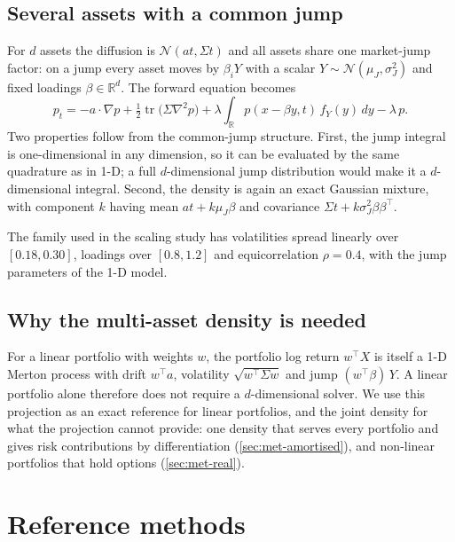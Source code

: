 \subsection{Several assets with a common jump}
For $d$ assets the diffusion is $\mathcal{N}(a t, \Sigma t)$ and all assets share one market-jump factor:
on a jump every asset moves by $\beta_i Y$ with a scalar $Y \sim \mathcal{N}(\mu_J, \sigma_J^2)$ and fixed
loadings $\beta \in \mathbb{R}^d$. The forward equation becomes
\begin{equation}
  p_t = -a \cdot \nabla p + \tfrac12 \operatorname{tr}\!\big(\Sigma \nabla^2 p\big)
        + \lambda \int_{\mathbb{R}} p(x - \beta y, t)\, f_Y(y)\,dy - \lambda\, p .
  \label{eq:pidend}
\end{equation}
Two properties follow from the common-jump structure. First, the jump integral is one-dimensional in any
dimension, so it can be evaluated by the same quadrature as in 1-D; a full $d$-dimensional jump distribution
would make it a $d$-dimensional integral. Second, the density is again an exact Gaussian mixture, with
component $k$ having mean $a t + k\mu_J\beta$ and covariance $\Sigma t + k\sigma_J^2\beta\beta^\top$.

The family used in the scaling study has volatilities spread linearly over $[0.18, 0.30]$, loadings over
$[0.8, 1.2]$ and equicorrelation $\rho = 0.4$, with the jump parameters of the 1-D model.

\subsection{Why the multi-asset density is needed}
For a linear portfolio with weights $w$, the portfolio log return $w^\top X$ is itself a 1-D Merton process
with drift $w^\top a$, volatility $\sqrt{w^\top \Sigma w}$ and jump $(w^\top \beta)\,Y$. A linear portfolio
alone therefore does not require a $d$-dimensional solver. We use this projection as an exact reference for
linear portfolios, and the joint density for what the projection cannot provide: one density that serves every
portfolio and gives risk contributions by differentiation (\cref{sec:met-amortised}), and non-linear
portfolios that hold options (\cref{sec:met-real}).

\section{Reference methods}
\label{sec:met-reference}

